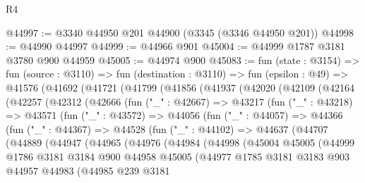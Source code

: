 \begin{lexlean}{R4}
\begin{coremodule}
@44997 := @3340 @44950 @201 @44900 (@3345 (@3346 @44950 @201))
@44998 := @44990 @44997
@44999 := @44966 @901
@45004 := @44999 @1787 @3181 @3780 @900 @44959
@45005 := @44974 @900
@45083 := fun (state : @3154) =>
  fun (source : @3110) =>
  fun (destination : @3110) =>
  fun (epsilon : @49) =>
  @41576
    (@41692
      (@41721
        (@41799
          (@41856
            (@41937
              (@42020
                (@42109
                  (@42164
                    (@42257
                      (@42312
                        (@42666
                          (fun ("_" : @42667) =>
                          @43217
                            (fun ("_" : @43218) =>
                            @43571
                              (fun ("_" : @43572) =>
                              @44056
                                (fun ("_" : @44057) =>
                                @44366
                                  (fun ("_" : @44367) =>
                                  @44528
                                    (fun ("_" : @44102) =>
                                    @44637
                                      (@44707
                                        (@44889
                                          (@44947
                                            (@44965
                                              (@44976
                                                (@44984
                                                  (@44998
                                                    (@45004
                                                      @45005
                                                      (@44999
                                                        @1786
                                                        @3181
                                                        @3184
                                                        @900
                                                        @44958
                                                        @45005
                                                        (@44977
                                                          @1785
                                                          @3181
                                                          @3183
                                                          @903
                                                          @44957
                                                          @44983
                                                          (@44985
                                                            @239
                                                            @3181

\end{coremodule}
\end{lexlean}
